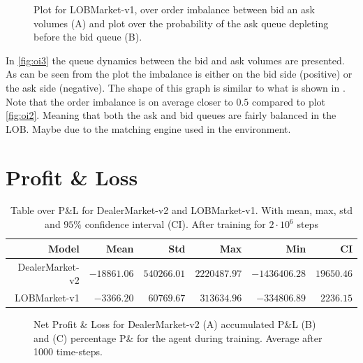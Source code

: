 \documentclass{kththesis}
\theoremstyle{definition}
\begin{document}
\begin{figure}[H]
	    	\centering
		
		\caption{Plot for LOBMarket-v1, over order imbalance between bid an ask volumes (A) and plot over the probability of the ask queue depleting before the bid queue (B).}
		\label{fig:oi3}
\end{figure}
In \autoref{fig:oi3} the queue dynamics between the bid and ask volumes are presented. As can be seen from the plot the imbalance is either on the bid side (positive) or the ask side (negative). The shape of this graph is similar to what is shown in \parencite{bouchaud2018trades}. Note that the order imbalance is on average closer to $0.5$ compared to plot \autoref{fig:oi2}. Meaning that both the ask and bid queues are fairly balanced in the LOB. Maybe due to the matching engine used in the environment.

\section{Profit \& Loss}

\begin{table}[H]
\centering
\caption{Table over P\&L for DealerMarket-v2 and LOBMarket-v1. With mean, max, std and $95\%$ confidence interval (CI). After training for $2\cdot10^6$ steps}
\label{tab:pnl1}
\begin{tabular}{rrrrrr}
  \hline
 \textbf{Model} & \textbf{Mean} & \textbf{Std} & \textbf{Max} & \textbf{Min} & \textbf{CI} \\ 
  \hline
DealerMarket-v2 & $-18861.06$ & $540266.01$ & $2220487.97$ & $-1436406.28$ & $19650.46$ \\ 
LOBMarket-v1& $-3366.20$ & $60769.67$ & $313634.96$ & $-334806.89$ & $2236.15$ \\ 
   \hline
\end{tabular}
\end{table}

\begin{figure}[H]
    \centering
    
    \caption{Net Profit \& Loss for DealerMarket-v2 (A) accumulated P\&L (B) and (C) percentage P\& for the agent during training. Average after 1000 time-steps.}
    \label{fig:pnl1}
\end{figure}
\end{document}
